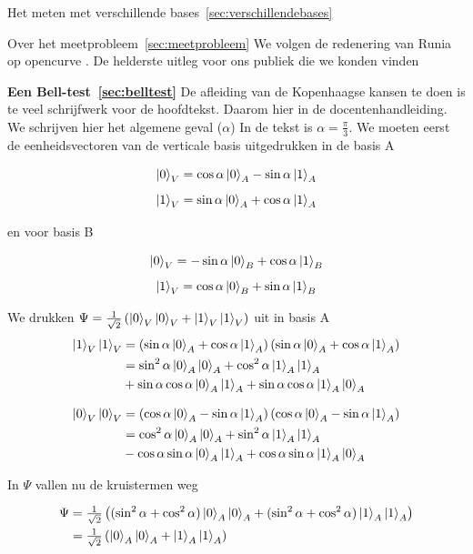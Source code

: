 \documentclass[../../main.tex]{subfiles}
\begin{document}
Het meten met verschillende bases~\ref{sec:verschillendebases}

Over het meetprobleem~\ref{sec:meetprobleem}
We volgen de redenering van Runia op opencurve \cite{runiaopencurve}. De helderste uitleg voor ons publiek die we konden vinden 

\textbf{Een Bell-test~\ref{sec:belltest}}
De  afleiding van de Kopenhaagse kansen te doen is te veel schrijfwerk voor de hoofdtekst. Daarom hier in de docentenhandleiding. We schrijven hier het algemene geval ($\alpha$) In de tekst is $\alpha = \tfrac{\pi}{3}$. We moeten eerst de eenheidsvectoren van de verticale basis uitgedrukken in de basis A


\[\ket{0}_V = \cos{\alpha}\ket{0}_A - \sin{\alpha}\ket{1}_A\]
\[\ket{1}_V = \sin{\alpha}\ket{0}_A + \cos{\alpha}\ket{1}_A\]

en voor basis B

\[\ket{0}_V = -\sin{\alpha}\ket{0}_B + \cos{\alpha}\ket{1}_B\]
\[\ket{1}_V = \cos{\alpha}\ket{0}_B + \sin{\alpha}\ket{1}_B\]

We drukken $\Psi= \tfrac{1}{\sqrt{2}}\left(\ket{0}_V\ket{0}_V+\ket{1}_V\ket{1}_V\right)$ uit in basis A
\begin{align*}
\ket{1}_V\ket{1}_V &= \left(\sin{\alpha}\ket{0}_A + \cos{\alpha}\ket{1}_A\right)\left(\sin{\alpha}\ket{0}_A + \cos{\alpha}\ket{1}_A\right) \\
     & = \sin^2{\alpha}\ket{0}_A\ket{0}_A 
       + \cos^2{\alpha}\ket{1}_A\ket{1}_A \\
     & + \sin{\alpha}\cos{\alpha}\ket{0}_A\ket{1}_A
       + \sin{\alpha}\cos{\alpha}\ket{1}_A\ket{0}_A
\end{align*}

\begin{align*}
\ket{0}_V\ket{0}_V &= \left(\cos{\alpha}\ket{0}_A - \sin{\alpha}\ket{1}_A\right)\left(\cos{\alpha}\ket{0}_A - \sin{\alpha}\ket{1}_A\right) \\
     & = \cos^2{\alpha}\ket{0}_A\ket{0}_A 
       + \sin^2{\alpha}\ket{1}_A\ket{1}_A \\
     & - \cos{\alpha}\sin{\alpha}\ket{0}_A\ket{1}_A
       + \cos{\alpha}\sin{\alpha}\ket{1}_A\ket{0}_A
\end{align*}

In $\Psi$ vallen nu de kruistermen weg

\begin{align*}
\Psi & =\tfrac{1}{\sqrt{2}}\left((\sin^2{\alpha}+\cos^2{\alpha})\ket{0}_A\ket{0}_A
       +(\sin^2{\alpha}+\cos^2{\alpha})\ket{1}_A\ket{1}_A\right) \\
     & = \tfrac{1}{\sqrt{2}}\left(\ket{0}_A\ket{0}_A + \ket{1}_A\ket{1}_A\right)
\end{align*}
\end{document}

